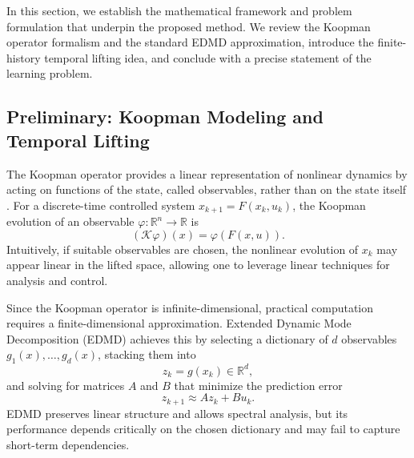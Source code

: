 \documentclass[journal]{IEEEtran}
\begin{document}
In this section, we establish the mathematical framework and problem formulation that underpin the proposed method. We review the Koopman operator formalism and the standard EDMD approximation, introduce the finite-history temporal lifting idea, and conclude with a precise statement of the learning problem.

\subsection{Preliminary: Koopman Modeling and Temporal Lifting}
\label{sec:preliminary}

The Koopman operator provides a linear representation of nonlinear dynamics by acting on functions of the state, called observables, rather than on the state itself \cite{koopman1931hamiltonian, mezic2005spectral, rowley2009spectral, brunton2022modern}. For a discrete-time controlled system $x_{k+1} = F(x_k,u_k)$, the Koopman evolution of an observable $\varphi:\mathbb{R}^n\to\mathbb{R}$ is
\begin{equation}
    (\mathcal{K}\varphi)(x) = \varphi(F(x,u)).
    \label{eq:koopman_operator}
\end{equation}
Intuitively, if suitable observables are chosen, the nonlinear evolution of $x_k$ may appear linear in the lifted space, allowing one to leverage linear techniques for analysis and control.

Since the Koopman operator is infinite-dimensional, practical computation requires a finite-dimensional approximation. Extended Dynamic Mode Decomposition (EDMD) achieves this by selecting a dictionary of $d$ observables $g_1(x),\ldots,g_d(x)$, stacking them into
\begin{equation}
    z_k = g(x_k) \in \mathbb{R}^d,
    \label{eq:instantaneous_lifting}
\end{equation}
and solving for matrices $A$ and $B$ that minimize the prediction error
\begin{equation}
    z_{k+1} \approx A z_k + B u_k.
    \label{eq:learned_dynamics}
\end{equation}
EDMD preserves linear structure and allows spectral analysis, but its performance depends critically on the chosen dictionary and may fail to capture short-term dependencies.
\end{document}
